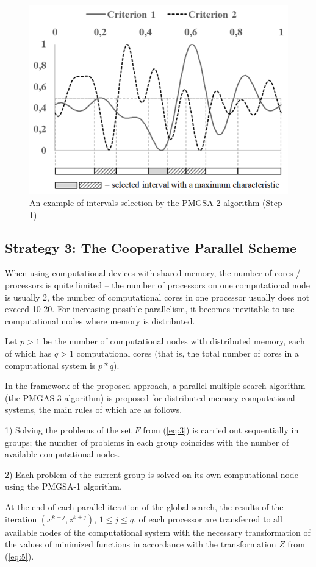 \documentclass[review]{elsarticle}
\begin{document}
\begin{figure}
  \centering
  \includegraphics[width=0.7\linewidth]{fig3}
  \caption{An example of intervals selection by the PMGSA-2 algorithm (Step 1)}
  \label{fig:3}
\end{figure}

\subsection{Strategy 3: The Cooperative Parallel Scheme} \label{subsec:3}

When using computational devices with shared memory, the number of cores / processors is quite limited -- the number of processors on one computational node is usually 2, the number of computational cores in one processor usually does not exceed 10-20. For increasing possible parallelism, it becomes inevitable to use computational nodes where memory is distributed.

Let $p>1$ be the number of computational nodes with distributed memory, each of which has $q>1$ computational cores (that is, the total number of cores in a computational system is $p*q$). 

In the framework of the proposed approach, a parallel multiple search algorithm (the PMGAS-3 algorithm) is proposed for distributed memory computational systems, the main rules of which are as follows.

1) Solving the problems of the set $F$ from (\ref{eq:3}) is carried out sequentially in groups; the number of problems in each group coincides with the number of available computational nodes.

2) Each problem of the current group is solved on its own computational node using the PMGSA-1 algorithm.

At the end of each parallel iteration of the global search, the results of the iteration $(x^{k+j}, z^{k+j})$, $1 \leq j \leq q$, of each processor are transferred to all available nodes of the computational system with the necessary transformation of the values of minimized functions in accordance with the transformation $Z$ from (\ref{eq:5}).
		
\end{document}
